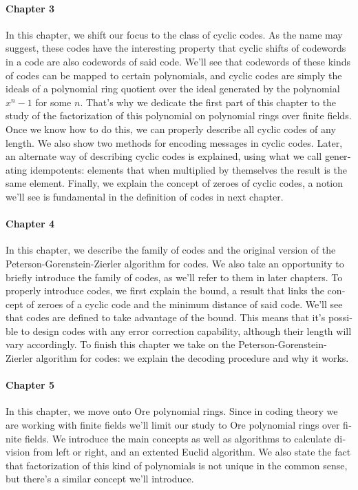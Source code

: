 \begin{otherlanguage}{english}
\paragraph{Chapter 3} In this chapter, we shift our focus to the class of cyclic codes. 
As the name may suggest, these codes have the interesting property that cyclic shifts of codewords in a code are also codewords of said code.
We'll see that codewords of these kinds of codes can be mapped to certain polynomials, and cyclic codes are simply the ideals of a polynomial ring quotient over the ideal generated by the polynomial \(x^n - 1\) for some \(n\).
That's why we dedicate the first part of this chapter to the study of the factorization of this polynomial on polynomial rings over finite fields.
Once we know how to do this, we can properly describe all cyclic codes of any length.
We also show two methods for encoding messages in cyclic codes.
Later, an alternate way of describing cyclic codes is explained, using what we call generating idempotents: elements that when multiplied by themselves the result is the same element.
Finally, we explain the concept of zeroes of cyclic codes, a notion we'll see is fundamental in the definition of  codes in next chapter.

\paragraph{Chapter 4} In this chapter, we describe the family of  codes and the original version of the Peterson-Gorenstein-Zierler algorithm for  codes.
We also take an opportunity to briefly introduce the family of  codes, as we'll refer to them in later chapters.
To properly introduce  codes, we first explain the  bound, a result that links the concept of zeroes of a cyclic code and the minimum distance of said code.
We'll see that  codes are defined to take advantage of the  bound.
This means that it's possible to design  codes with any error correction capability, although their length will vary accordingly.
To finish this chapter we take on the Peterson-Gorenstein-Zierler algorithm for  codes: we explain the decoding procedure and why it works.

\paragraph{Chapter 5} In this chapter, we move onto Ore polynomial rings.
Since in coding theory we are working with finite fields we'll limit our study to Ore polynomial rings over finite fields.
We introduce the main concepts as well as algorithms to calculate division from left or right, and an extented Euclid algorithm.
We also state the fact that factorization of this kind of polynomials is not unique in the common sense, but there's a similar concept we'll introduce.


\end{otherlanguage}
